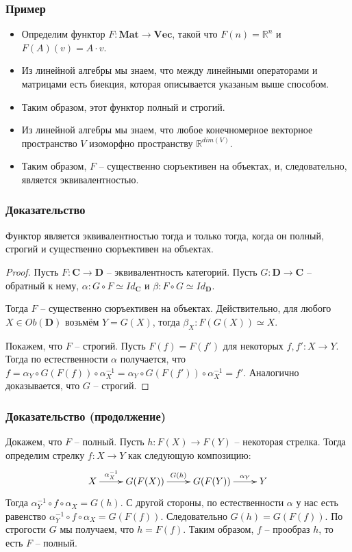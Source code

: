\documentclass{beamer}
\theoremstyle{definition}
\newcommand{\cat}[1]{\mathbf{#1}}
\renewcommand{\C}{\cat{C}}
\newcommand{\D}{\cat{D}}
\renewcommand{\Vec}{\cat{Vec}}
\newcommand{\Mat}{\cat{Mat}}
\begin{document}
\begin{frame}
\frametitle{Пример}
\begin{itemize}
\item Определим функтор $F : \Mat \to \Vec$, такой что $F(n) = \mathbb{R}^n$ и $F(A)(v) = A \cdot v$.
\item Из линейной алгебры мы знаем, что между линейными операторами и матрицами есть биекция, которая описывается указаным выше способом.
\item Таким образом, этот функтор полный и строгий.
\item Из линейной алгебры мы знаем, что любое конечномерное векторное пространство $V$ изоморфно пространству $\mathbb{R}^{dim(V)}$.
\item Таким образом, $F$ -- существенно сюръективен на объектах, и, следовательно, является эквивалентностью.
\end{itemize}
\end{frame}

\begin{frame}
\frametitle{Доказательство}
\begin{prop}
Функтор является эквивалентностью тогда и только тогда, когда он полный, строгий и существенно сюръективен на объектах.
\end{prop}
\begin{proof}
Пусть $F : \C \to \D$ -- эквивалентность категорий.
Пусть $G : \D \to \C$ -- обратный к нему, $\alpha : G \circ F \simeq Id_\C$ и $\beta : F \circ G \simeq Id_\D$.

Тогда $F$ -- существенно сюръективен на объектах.
Действительно, для любого $X \in Ob(\D)$ возьмём $Y = G(X)$, тогда $\beta_X : F(G(X)) \simeq X$.

Покажем, что $F$ -- строгий.
Пусть $F(f) = F(f')$ для некоторых $f,f' : X \to Y$.
Тогда по естественности $\alpha$ получается, что $f = \alpha_Y \circ G(F(f)) \circ \alpha^{-1}_X = \alpha_Y \circ G(F(f')) \circ \alpha^{-1}_X = f'$.
Аналогично доказывается, что $G$ -- строгий.
\end{proof}
\end{frame}

\begin{frame}
\frametitle{Доказательство (продолжение)}
Докажем, что $F$ -- полный.
Пусть $h : F(X) \to F(Y)$ -- некоторая стрелка.
Тогда определим стрелку $f : X \to Y$ как следующую композицию:
\[ \xymatrix{ X \ar[r]^-{\alpha^{-1}_X} & G(F(X)) \ar[r]^{G(h)} & G(F(Y)) \ar[r]^-{\alpha_Y} & Y } \]
Тогда $\alpha^{-1}_Y \circ f \circ \alpha_X = G(h)$.
С другой стороны, по естественности $\alpha$ у нас есть равенство $\alpha^{-1}_Y \circ f \circ \alpha_X = G(F(f))$.
Следовательно $G(h) = G(F(f))$.
По строгости $G$ мы получаем, что $h = F(f)$.
Таким образом, $f$ -- прообраз $h$, то есть $F$ -- полный.
\end{frame}
\end{document}
